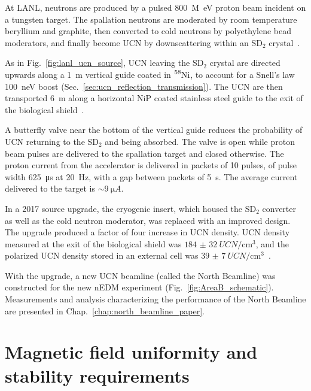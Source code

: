 At LANL, neutrons are produced by a pulsed \qty{800}{M\eV} proton beam incident on a tungsten target. The spallation neutrons are moderated by room temperature beryllium and graphite, then converted to cold neutrons by polyethylene bead moderators, and finally become UCN by downscattering within an SD$_2$ crystal~\cite{saunders_performance_2013}.

As in Fig.~\ref{fig:lanl_ucn_source}, UCN leaving the SD$_2$ crystal are directed upwards along a \qty{1}{\meter} vertical guide coated in $\ce{^{58}Ni}$, to account for a Snell's law \qty{100}{\nano\eV} boost (Sec.~\ref{sec:ucn_reflection_transmission}). The UCN are then transported \qty{6}{\meter} along a horizontal NiP coated stainless steel guide to the exit of the biological shield~\cite{ito_performance_2018}.

A butterfly valve near the bottom of the vertical guide reduces the probability of UCN returning to the SD$_2$ and being absorbed. The valve is open while proton beam pulses are delivered to the spallation target and closed otherwise. The proton current from the accelerator is delivered in packets of 10 pulses, of pulse width \qty{625}{\micro\s} at \qty{20}{\hertz}, with a gap between packets of \qty{5}{\s}. The average current delivered to the target is $\sim\qty{9}{\micro A}$.

In a 2017 source upgrade, the cryogenic insert, which housed the SD$_2$ converter as well as the cold neutron moderator, was replaced with an improved design. The upgrade produced a factor of four increase in UCN density. UCN density measured at the exit of the biological shield was $\qty{184(32)}{UCN\per \cm^3}$, and the polarized UCN density stored in an external cell was $\qty{39(7)}{UCN\per \cm^3}$~\cite{ito_performance_2018}.

With the upgrade, a new UCN beamline (called the North Beamline) was constructed for the new nEDM experiment (Fig.~\ref{fig:AreaB_schematic}). Measurements and analysis characterizing the performance of the North Beamline are presented in Chap.~\ref{chap:north_beamline_paper}.



\section
{
    Magnetic field uniformity and stability requirements\label{sec:magnetic_field_req}
}



